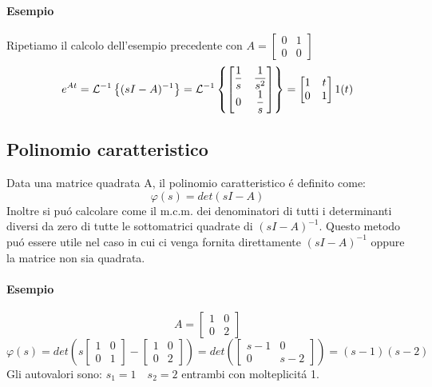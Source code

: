 \documentclass[../main.tex]{subfiles}
\begin{document}
\begin{itemize}
				\begin{mdframed}[style=Esempio]
					\paragraph{Esempio}
					Ripetiamo il calcolo dell'esempio precedente con $ A = \begin{bmatrix} 0 & 1\\ 0 & 0 \end{bmatrix} $
					\[
						e^{At} = \mathcal{L}^{-1} \left\lbrace (sI-A)^{-1} \right\rbrace =
						\mathcal{L}^{-1} \left\lbrace 
							\begin{bmatrix}
								\dfrac{1}{s} & \dfrac{1}{s^2}
								\\[0.5em]
								0 & \dfrac{1}{s}
							\end{bmatrix}
						 \right\rbrace = 
						\begin{bmatrix}
							1 & t\\
							0 & 1
						\end{bmatrix} 1(t)
					\]
				\end{mdframed}
		\end{itemize}
	
	\subsection{Polinomio caratteristico}
		Data una matrice quadrata A, il polinomio caratteristico \'e definito come:
		\[ 
			\varphi(s) = det(sI - A)
		\]
		Inoltre si pu\'o calcolare come il m.c.m. dei denominatori di tutti i determinanti diversi da zero di tutte le sottomatrici quadrate di $ (sI-A)^{-1} $. Questo metodo pu\'o essere utile nel caso in cui ci venga fornita direttamente $ (sI-A)^{-1} $ oppure la matrice non sia quadrata.
		
		\begin{mdframed}[style=Esempio]
			\paragraph{Esempio}
			\[ 
				A = 
				\begin{bmatrix}
					1 & 0\\
					0 & 2
				\end{bmatrix}
			\]
			\[
				\varphi(s) = det \left( s 
				\begin{bmatrix}
					1 & 0\\
					0 & 1
				\end{bmatrix} -
				\begin{bmatrix}
					1 & 0\\
					0 & 2
				\end{bmatrix} \right) = det \left( 
				\begin{bmatrix}
					s-1 & 0\\
					0 & s-2
				\end{bmatrix} \right) = (s-1)(s-2)
			\]
			Gli autovalori sono: $ s_1 = 1 \quad s_2 = 2 $ entrambi con molteplicit\'a 1.
		\end{mdframed}
		
\end{document}
